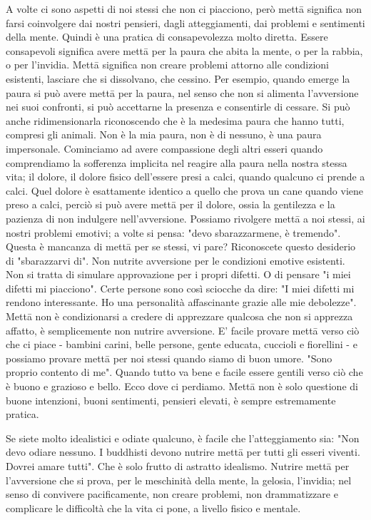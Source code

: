 A volte ci sono aspetti di noi stessi che non ci piacciono, però mettā
significa non farsi coinvolgere dai nostri pensieri, dagli
atteggiamenti, dai problemi e sentimenti della mente. Quindi è una
pratica di consapevolezza molto diretta. Essere consapevoli significa
avere mettā per la paura che abita la mente, o per la rabbia, o per
l'invidia. Mettā significa non creare problemi attorno alle condizioni
esistenti, lasciare che si dissolvano, che cessino. Per esempio, quando
emerge la paura si può avere mettā per la paura, nel senso che non si
alimenta l'avversione nei suoi confronti, si può accettarne la presenza
e consentirle di cessare. Si può anche ridimensionarla riconoscendo che
è la medesima paura che hanno tutti, compresi gli animali. Non è la mia
paura, non è di nessuno, è una paura impersonale. Cominciamo ad avere
compassione degli altri esseri quando comprendiamo la sofferenza
implicita nel reagire alla paura nella nostra stessa vita; il dolore, il
dolore fisico dell'essere presi a calci, quando qualcuno ci prende a
calci. Quel dolore è esattamente identico a quello che prova un cane
quando viene preso a calci, perciò si può avere mettā per il dolore,
ossia la gentilezza e la pazienza di non indulgere nell'avversione.
Possiamo rivolgere mettā a noi stessi, ai nostri problemi emotivi; a
volte si pensa: "devo sbarazzarmene, è tremendo". Questa è mancanza di
mettā per se stessi, vi pare? Riconoscete questo desiderio di
"sbarazzarvi di". Non nutrite avversione per le condizioni emotive
esistenti. Non si tratta di simulare approvazione per i propri difetti.
O di pensare "i miei difetti mi piacciono". Certe persone sono così
sciocche da dire: "I miei difetti mi rendono interessante. Ho una
personalità affascinante grazie alle mie debolezze". Mettā non è
condizionarsi a credere di apprezzare qualcosa che non si apprezza
affatto, è semplicemente non nutrire avversione. E' facile provare mettā
verso ciò che ci piace - bambini carini, belle persone, gente educata,
cuccioli e fiorellini - e possiamo provare mettā per noi stessi quando
siamo di buon umore. "Sono proprio contento di me". Quando tutto va bene
e facile essere gentili verso ciò che è buono e grazioso e bello. Ecco
dove ci perdiamo. Mettā non è solo questione di buone intenzioni, buoni
sentimenti, pensieri elevati, è sempre estremamente pratica.

Se siete molto idealistici e odiate qualcuno, è facile che
l'atteggiamento sia: "Non devo odiare nessuno. I buddhisti devono
nutrire mettā per tutti gli esseri viventi. Dovrei amare tutti". Che è
solo frutto di astratto idealismo. Nutrire mettā per l'avversione che si
prova, per le meschinità della mente, la gelosia, l'invidia; nel senso
di convivere pacificamente, non creare problemi, non drammatizzare e
complicare le difficoltà che la vita ci pone, a livello fisico e
mentale.

